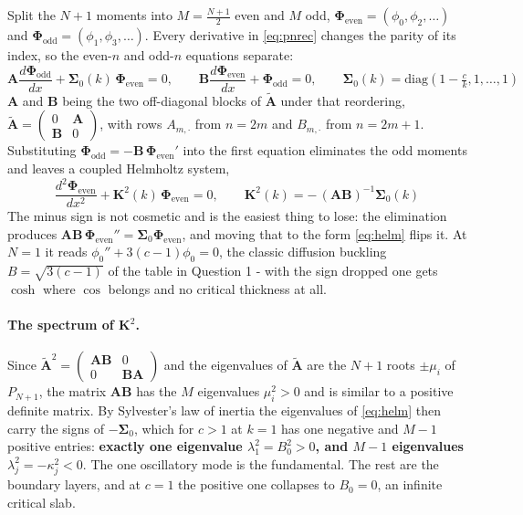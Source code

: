 {Split the $N+1$ moments into $M=\tfrac{N+1}{2}$ even and $M$ odd,
$\boldsymbol{\Phi}_{\text{even}}=(\phi_0,\phi_2,\dots)$ and
$\boldsymbol{\Phi}_{\text{odd}}=(\phi_1,\phi_3,\dots)$. Every derivative in \eqref{eq:pnrec}
changes the parity of its index, so the even-$n$ and odd-$n$ equations separate:
\begin{equation}
    \mathbf{A}\frac{d\boldsymbol{\Phi}_{\text{odd}}}{dx} + \mathbf{\Sigma}_0(k)\,\boldsymbol{\Phi}_{\text{even}} = 0,
    \qquad
    \mathbf{B}\frac{d\boldsymbol{\Phi}_{\text{even}}}{dx} + \boldsymbol{\Phi}_{\text{odd}} = 0,
    \qquad
    \mathbf{\Sigma}_0(k)=\text{diag}\!\left(1-\tfrac{c}{k},1,\dots,1\right)
\end{equation}
$\mathbf{A}$ and $\mathbf{B}$ being the two off-diagonal blocks of $\mathbf{\tilde A}$ under
that reordering, $\mathbf{\tilde A}=\left(\begin{smallmatrix}0&\mathbf{A}\\\mathbf{B}&0\end{smallmatrix}\right)$,
with rows $A_{m,\cdot}$ from $n=2m$ and $B_{m,\cdot}$ from $n=2m+1$. Substituting
$\boldsymbol{\Phi}_{\text{odd}}=-\mathbf{B}\,\boldsymbol{\Phi}_{\text{even}}'$ into the first
equation eliminates the odd moments and leaves a coupled Helmholtz system,
\begin{equation}
    \frac{d^2\boldsymbol{\Phi}_{\text{even}}}{dx^2} + \mathbf{K}^2(k)\,\boldsymbol{\Phi}_{\text{even}} = 0,
    \qquad
    \mathbf{K}^2(k) = -\,(\mathbf{A}\mathbf{B})^{-1}\mathbf{\Sigma}_0(k)
    \label{eq:helm}
\end{equation}
The minus sign is not cosmetic and is the easiest thing to lose: the elimination produces
$\mathbf{A}\mathbf{B}\,\boldsymbol{\Phi}_{\text{even}}''=\mathbf{\Sigma}_0\boldsymbol{\Phi}_{\text{even}}$,
and moving that to the form \eqref{eq:helm} flips it. At $N=1$ it reads $\phi_0''+3(c-1)\phi_0=0$,
the classic diffusion buckling $B=\sqrt{3(c-1)}$ of the table in Question 1 - with the sign dropped
one gets $\cosh$ where $\cos$ belongs and no critical thickness at all.

\paragraph{The spectrum of $\mathbf{K}^2$.} Since
$\mathbf{\tilde A}^2=\left(\begin{smallmatrix}\mathbf{AB}&0\\0&\mathbf{BA}\end{smallmatrix}\right)$ and the
eigenvalues of $\mathbf{\tilde A}$ are the $N+1$ roots $\pm\mu_i$ of $P_{N+1}$, the matrix
$\mathbf{A}\mathbf{B}$ has the $M$ eigenvalues $\mu_i^2>0$ and is similar to a positive definite
matrix. By Sylvester's law of inertia the eigenvalues of \eqref{eq:helm} then carry the signs of
$-\mathbf{\Sigma}_0$, which for $c>1$ at $k=1$ has one negative and $M-1$ positive entries:
\textbf{exactly one eigenvalue $\lambda_1^2=B_0^2>0$, and $M-1$ eigenvalues
$\lambda_j^2=-\kappa_j^2<0$}. The one oscillatory mode is the fundamental. The rest are the
boundary layers, and at $c=1$ the positive one collapses to $B_0=0$, an infinite critical slab.

}
